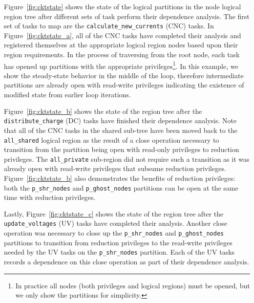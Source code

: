 Figure~\ref{fig:cktstate} shows the state of the
logical partitions in the node logical region tree
after different sets of task perform their 
dependence analysis. The first set of tasks to
map are the {\tt calculate\_new\_currents} (CNC)
tasks.  In Figure~\ref{fig:cktstate_a}, all of the
CNC tasks have completed their analysis and registered
themselves at the appropriate logical region nodes
based upon their region requirements. In the process
of traversing from the root node, each task has opened
up partitions with the appropriate privileges\footnote{In
practice all nodes (both privileges and logical regions)
must be opened, but we only show the partitions
for simplicity.}. In this example, we show the steady-state
behavior in the middle of the loop, therefore intermediate
partitions are already open with read-write privileges
indicating the existence of modified state from earlier
loop iterations. 

Figure~\ref{fig:cktstate_b} shows the
state of the region tree after the {\tt distribute\_charge}
(DC) tasks have finished their dependence analysis.
Note that all of the CNC tasks in the shared sub-tree have
been moved back to the {\tt all\_shared} logical region
as the result of a close operation necessary to transition
from the partition being open with read-only privileges
to reduction privileges. The {\tt all\_private} sub-region
did not require such a transition as it was already open
with read-write privileges that subsume reduction privileges.
Figure~\ref{fig:cktstate_b} also demonstrates the benefits
of reduction privileges: both the {\tt p\_shr\_nodes} and
{\tt p\_ghost\_nodes} partitions can be open at the same
time with reduction privileges.

Lastly, Figure~\ref{fig:cktstate_c} shows the state of
the region tree after the {\tt update\_voltages} (UV)
tasks have completed their analysis. Another close operation
was necessary to close up the {\tt p\_shr\_nodes} and 
{\tt p\_ghost\_nodes} partitions to transition from 
reduction privileges to the read-write privileges needed
by the UV tasks on the {\tt p\_shr\_nodes} partition.
Each of the UV tasks records a dependence on this close
operation as part of their dependence analysis.


